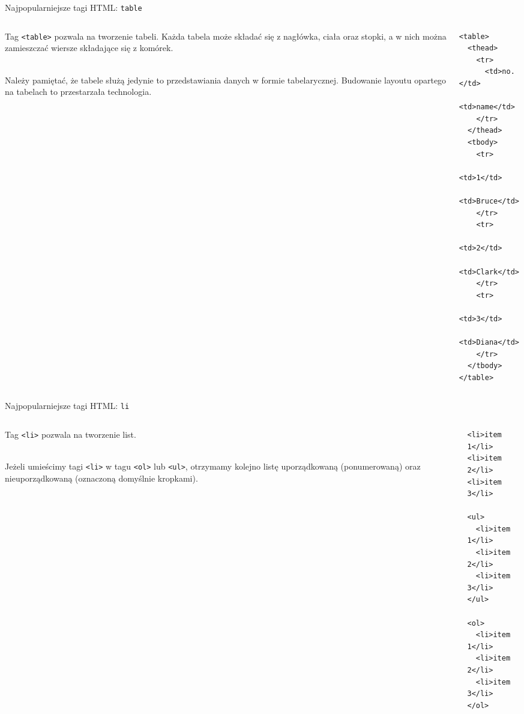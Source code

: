 \begin{frame}[fragile]{Najpopularniejsze tagi HTML: \texttt{table}}

\begin{columns}
\begin{column}{0.5\textwidth}
	Tag \texttt{<table>} pozwala na tworzenie tabeli. Każda tabela może składać się z nagłówka, ciała oraz stopki, a w nich można zamieszczać wiersze składające się z komórek. 
	
	\ \\
	
	Należy pamiętać, że tabele służą jedynie to przedstawiania danych w formie tabelarycznej. Budowanie layoutu opartego na tabelach to przestarzała technologia.
\end{column}
\begin{column}{0.5\textwidth}
\begin{lstlisting}
<table>
  <thead>
    <tr>
      <td>no.</td>
      <td>name</td>
    </tr>
  </thead>
  <tbody>
    <tr>
      <td>1</td>
      <td>Bruce</td>
    </tr>
    <tr>
      <td>2</td>
      <td>Clark</td>
    </tr>
    <tr>
      <td>3</td>
      <td>Diana</td>
    </tr>
  </tbody>
</table>
\end{lstlisting}
\end{column}
\end{columns}

\end{frame}

\begin{frame}[fragile]{Najpopularniejsze tagi HTML: \texttt{li}}

\begin{columns}
\begin{column}{0.5\textwidth}
	Tag \texttt{<li>} pozwala na tworzenie list. 
	
	\ \\
	
	Jeżeli umieścimy tagi \texttt{<li>} w tagu \texttt{<ol>} lub \texttt{<ul>}, otrzymamy kolejno listę uporządkowaną (ponumerowaną) oraz nieuporządkowaną (oznaczoną domyślnie kropkami).
\end{column}
\begin{column}{0.5\textwidth}
\begin{lstlisting}
<li>item 1</li>
<li>item 2</li>
<li>item 3</li>

<ul>
  <li>item 1</li>
  <li>item 2</li>
  <li>item 3</li>
</ul>

<ol>
  <li>item 1</li>
  <li>item 2</li>
  <li>item 3</li>
</ol>
\end{lstlisting}
\end{column}
\end{columns}

\end{frame}

